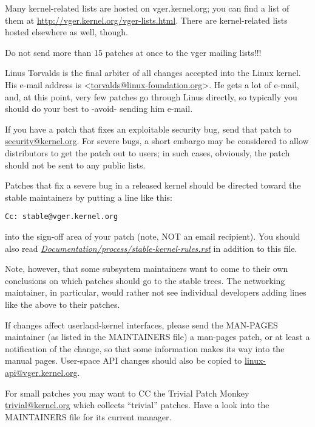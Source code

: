 \documentclass[a4paper,8pt,english]{sphinxmanual}
\begin{document}
Many kernel-related lists are hosted on vger.kernel.org; you can find a
list of them at \href{http://vger.kernel.org/vger-lists.html}{http://vger.kernel.org/vger-lists.html}.  There are
kernel-related lists hosted elsewhere as well, though.

Do not send more than 15 patches at once to the vger mailing lists!!!

Linus Torvalds is the final arbiter of all changes accepted into the
Linux kernel.  His e-mail address is \textless{}\href{mailto:torvalds@linux-foundation.org}{torvalds@linux-foundation.org}\textgreater{}.
He gets a lot of e-mail, and, at this point, very few patches go through
Linus directly, so typically you should do your best to -avoid-
sending him e-mail.

If you have a patch that fixes an exploitable security bug, send that patch
to \href{mailto:security@kernel.org}{security@kernel.org}.  For severe bugs, a short embargo may be considered
to allow distributors to get the patch out to users; in such cases,
obviously, the patch should not be sent to any public lists.

Patches that fix a severe bug in a released kernel should be directed
toward the stable maintainers by putting a line like this:

\begin{Verbatim}[commandchars=\\\{\}]
Cc: stable@vger.kernel.org
\end{Verbatim}

into the sign-off area of your patch (note, NOT an email recipient).  You
should also read
{\hyperref[process/stable\string-kernel\string-rules:stable\string-kernel\string-rules]{\emph{Documentation/process/stable-kernel-rules.rst}}}
in addition to this file.

Note, however, that some subsystem maintainers want to come to their own
conclusions on which patches should go to the stable trees.  The networking
maintainer, in particular, would rather not see individual developers
adding lines like the above to their patches.

If changes affect userland-kernel interfaces, please send the MAN-PAGES
maintainer (as listed in the MAINTAINERS file) a man-pages patch, or at
least a notification of the change, so that some information makes its way
into the manual pages.  User-space API changes should also be copied to
\href{mailto:linux-api@vger.kernel.org}{linux-api@vger.kernel.org}.

For small patches you may want to CC the Trivial Patch Monkey
\href{mailto:trivial@kernel.org}{trivial@kernel.org} which collects ``trivial'' patches. Have a look
into the MAINTAINERS file for its current manager.
\end{document}
